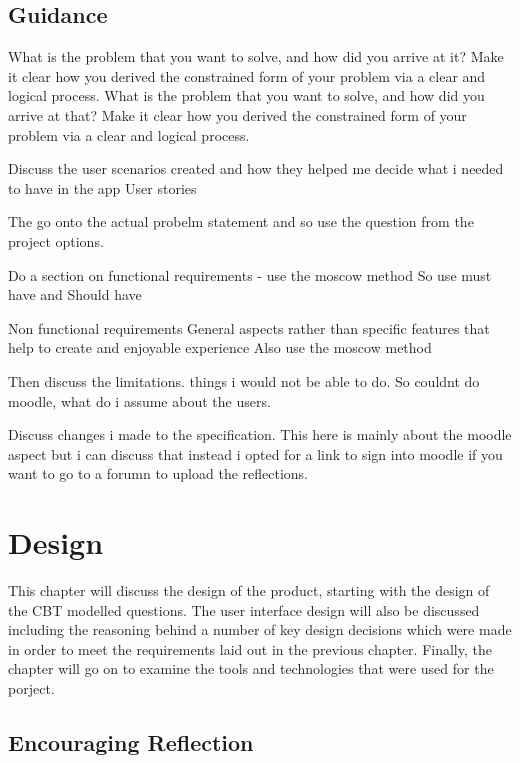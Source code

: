 \documentclass{l4proj}
\begin{document}
\section{Guidance}
What is the problem that you want to solve, and how did you arrive at it?
Make it clear how you derived the constrained form of your problem via a clear and logical process.
What is the problem that you want to solve, and how did you arrive at that?
Make it clear how you derived the constrained form of your problem via a clear and logical process. 
\par 
Discuss the user scenarios created and how they helped me decide what i needed to have in the app
User stories
\par 
The go onto the actual probelm statement and so use the question from the project options.
\par 
Do a section on functional requirements - use the moscow method
So use must have and Should have
\par 
Non functional requirements
General aspects rather than specific features that help to create and enjoyable experience
Also use the moscow method
\par 
Then discuss the limitations. things i would not be able to do.
So couldnt do moodle, what do i assume about the users. 
\par 
Discuss changes i made to the specification. This here is mainly about the moodle aspect but i can discuss 
that instead i opted for a link to sign into moodle if you want to go to a forumn to upload the reflections. 

\chapter{Design}

 This chapter will discuss the design of the product, starting with the design of the CBT modelled questions. The user interface design will also 
 be discussed including the reasoning behind a number of key design decisions which were made in order to meet the requirements laid out in the previous
 chapter. Finally, the chapter will go on to examine the tools and technologies that were used for the porject. 

\section{Encouraging Reflection}
\end{document}
